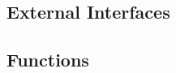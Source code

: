 \documentclass[compsoc,draftclsnofoot,onecolumn,10pt]{IEEEtran}
\begin{document}
\subsection{External Interfaces}
%
%

\subsection{Functions}
%
%
%
\end{document}
